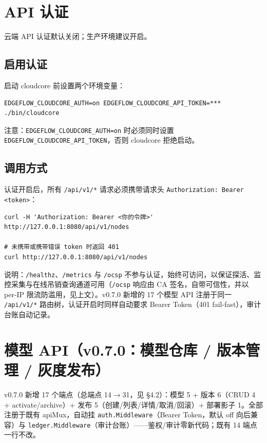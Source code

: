 \section{API 认证}

云端 API 认证默认关闭；生产环境建议开启。

\subsection{启用认证}

启动 cloudcore 前设置两个环境变量：

\begin{lstlisting}
EDGEFLOW_CLOUDCORE_AUTH=on EDGEFLOW_CLOUDCORE_API_TOKEN=*** ./bin/cloudcore
\end{lstlisting}

注意：\texttt{EDGEFLOW\_CLOUDCORE\_AUTH=on} 时必须同时设置 \texttt{EDGEFLOW\_CLOUDCORE\_API\_TOKEN}，否则 cloudcore 拒绝启动。

\subsection{调用方式}

认证开启后，所有 \texttt{/api/v1/*} 请求必须携带请求头 \texttt{Authorization: Bearer <token>}：

\begin{lstlisting}
curl -H 'Authorization: Bearer <你的令牌>' http://127.0.0.1:8080/api/v1/nodes

# 未携带或携带错误 token 时返回 401
curl http://127.0.0.1:8080/api/v1/nodes
\end{lstlisting}

说明：\texttt{/healthz}、\texttt{/metrics} 与 \texttt{/ocsp} 不参与认证，始终可访问，以保证探活、监控采集与在线吊销查询通道可用（\texttt{/ocsp} 响应由 CA 签名，自带可信性，并以 per-IP 限流防滥用，见上文）。v0.7.0 新增的 17 个模型 API 注册于同一 \texttt{/api/v1/*} 路由树，认证开启时同样自动要求 Bearer Token（401 fail-fast），审计台账自动记录。

\section{模型 API（v0.7.0：模型仓库 / 版本管理 / 灰度发布）}
\label{sec:model-api}

v0.7.0 新增 17 个端点（总端点 14$\rightarrow$31，见 \S4.2）：模型 5 + 版本 6（CRUD 4 + activate/archive）+ 发布 5（创建/列表/详情/取消/回滚）+ 部署影子 1。全部注册于既有 apiMux，自动挂 \texttt{auth.Middleware}（Bearer Token，默认 off 向后兼容）与 \texttt{ledger.Middleware}（审计台账）——鉴权/审计零新代码；既有 14 端点一行不改。

